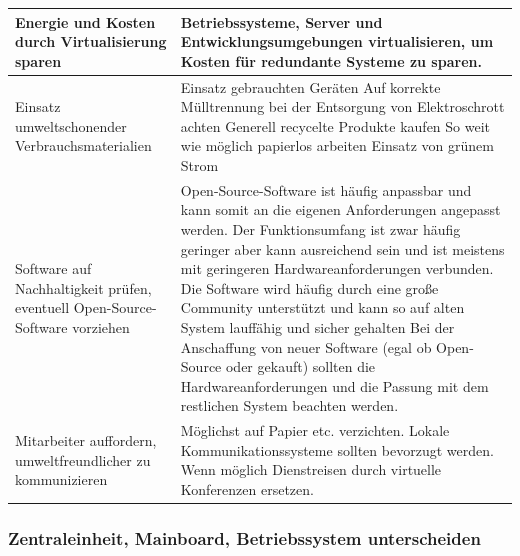 \documentclass[10pt]{article}
\begin{document}
\begin{flushleft}
\begin{table}[H]
\begin{tabular}{|p{}|p{}|}
        \\\hline

        Energie und Kosten durch Virtualisierung sparen & Betriebssysteme, Server und Entwicklungsumgebungen virtualisieren, um Kosten für redundante Systeme zu sparen.

        \\\hline

        Einsatz umweltschonender Verbrauchsmaterialien & Einsatz gebrauchten Geräten
        \newline Auf korrekte Mülltrennung bei der Entsorgung von Elektroschrott achten
        \newline Generell recycelte Produkte kaufen
        \newline So weit wie möglich papierlos arbeiten
        \newline Einsatz von grünem Strom

        \\\hline

        Software auf Nachhaltigkeit prüfen, eventuell Open-Source-Software vorziehen & Open-Source-Software ist häufig anpassbar und kann somit an die eigenen Anforderungen angepasst werden.
        \newline Der Funktionsumfang ist zwar häufig geringer aber kann ausreichend sein und ist meistens mit geringeren Hardwareanforderungen verbunden.
        \newline Die Software wird häufig durch eine große Community unterstützt und kann so auf alten System lauffähig und sicher gehalten
        \newline Bei der Anschaffung von neuer Software (egal ob Open-Source oder gekauft) sollten die Hardwareanforderungen und die Passung mit dem restlichen System beachten werden.

        \\\hline

        Mitarbeiter auffordern, umweltfreundlicher zu kommunizieren & Möglichst auf Papier etc. verzichten.
        \newline Lokale Kommunikationssysteme sollten bevorzugt werden.
        \newline Wenn möglich Dienstreisen durch virtuelle Konferenzen ersetzen.



    \\\hline
    \end{tabular}
\end{table}

\subsubsection{Zentraleinheit, Mainboard, Betriebssystem unterscheiden}


\end{flushleft}
\end{document}
